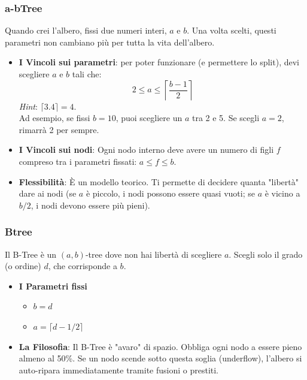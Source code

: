 \documentclass[a4paper,12pt]{article}
\begin{document}
\subsubsection{a-bTree}
Quando crei l'albero, fissi due numeri interi, $a$ e $b$. Una volta scelti, questi parametri non cambiano più per tutta la vita dell'albero.
\begin{itemize}
    \item \textbf{I Vincoli sui parametri}: per poter funzionare (e permettere lo split), devi scegliere $a$ e $b$ tali che:$$2 \le a \le \left\lceil \frac{b-1}{2} \right\rceil$$ \textit{Hint}: $\lceil3.4\rceil = 4$.
                                            \\Ad esempio, se fissi $b=10$, puoi scegliere un $a$ tra 2 e 5. Se scegli $a=2$, rimarrà 2 per sempre.
    \item \textbf{I Vincoli sui nodi}:  Ogni nodo interno deve avere un numero di figli $f$ compreso tra i parametri fissati: $a \le f \le b$.
    \item \textbf{Flessibilità}: È un modello teorico. Ti permette di decidere quanta "libertà" dare ai nodi (se $a$ è piccolo, i nodi possono essere quasi vuoti; se $a$ è vicino a $b/2$, i nodi devono essere più pieni).
\end{itemize}

\subsubsection{Btree}
Il B-Tree è un $(a, b)$-tree dove non hai libertà di scegliere $a$. Scegli solo il grado (o ordine) $d$, che corrisponde a $b$.

\begin{itemize}
    \item \textbf{I Parametri fissi}
    \begin{itemize}
        \item $b = d$
        \item $a = \lceil d-1/2 \rceil$
    \end{itemize}

    \item \textbf{La Filosofia}: Il B-Tree è "avaro" di spazio. Obbliga ogni nodo a essere pieno almeno al 50\%. Se un nodo scende sotto questa soglia (underflow), 
                                 l'albero si auto-ripara immediatamente tramite fusioni o prestiti.
\end{itemize}
\end{document}
